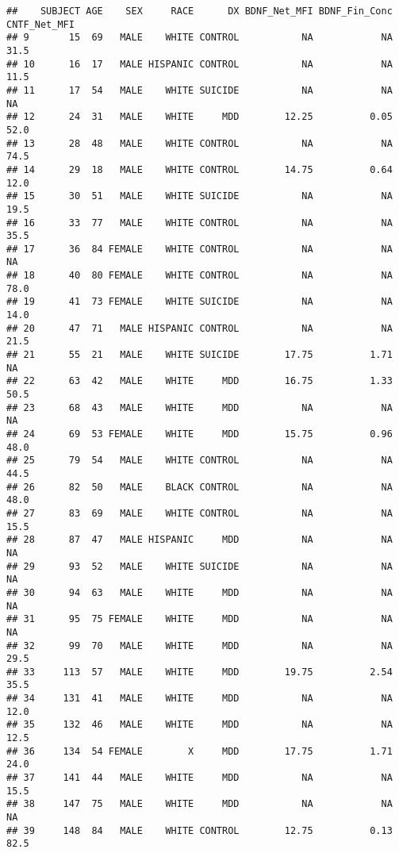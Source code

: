 \documentclass[]{article}
\begin{document}
\begin{verbatim}
##    SUBJECT AGE    SEX     RACE      DX BDNF_Net_MFI BDNF_Fin_Conc CNTF_Net_MFI
## 9       15  69   MALE    WHITE CONTROL           NA            NA         31.5
## 10      16  17   MALE HISPANIC CONTROL           NA            NA         11.5
## 11      17  54   MALE    WHITE SUICIDE           NA            NA           NA
## 12      24  31   MALE    WHITE     MDD        12.25          0.05         52.0
## 13      28  48   MALE    WHITE CONTROL           NA            NA         74.5
## 14      29  18   MALE    WHITE CONTROL        14.75          0.64         12.0
## 15      30  51   MALE    WHITE SUICIDE           NA            NA         19.5
## 16      33  77   MALE    WHITE CONTROL           NA            NA         35.5
## 17      36  84 FEMALE    WHITE CONTROL           NA            NA           NA
## 18      40  80 FEMALE    WHITE CONTROL           NA            NA         78.0
## 19      41  73 FEMALE    WHITE SUICIDE           NA            NA         14.0
## 20      47  71   MALE HISPANIC CONTROL           NA            NA         21.5
## 21      55  21   MALE    WHITE SUICIDE        17.75          1.71           NA
## 22      63  42   MALE    WHITE     MDD        16.75          1.33         50.5
## 23      68  43   MALE    WHITE     MDD           NA            NA           NA
## 24      69  53 FEMALE    WHITE     MDD        15.75          0.96         48.0
## 25      79  54   MALE    WHITE CONTROL           NA            NA         44.5
## 26      82  50   MALE    BLACK CONTROL           NA            NA         48.0
## 27      83  69   MALE    WHITE CONTROL           NA            NA         15.5
## 28      87  47   MALE HISPANIC     MDD           NA            NA           NA
## 29      93  52   MALE    WHITE SUICIDE           NA            NA           NA
## 30      94  63   MALE    WHITE     MDD           NA            NA           NA
## 31      95  75 FEMALE    WHITE     MDD           NA            NA           NA
## 32      99  70   MALE    WHITE     MDD           NA            NA         29.5
## 33     113  57   MALE    WHITE     MDD        19.75          2.54         35.5
## 34     131  41   MALE    WHITE     MDD           NA            NA         12.0
## 35     132  46   MALE    WHITE     MDD           NA            NA         12.5
## 36     134  54 FEMALE        X     MDD        17.75          1.71         24.0
## 37     141  44   MALE    WHITE     MDD           NA            NA         15.5
## 38     147  75   MALE    WHITE     MDD           NA            NA           NA
## 39     148  84   MALE    WHITE CONTROL        12.75          0.13         82.5

\end{verbatim}
\end{document}
